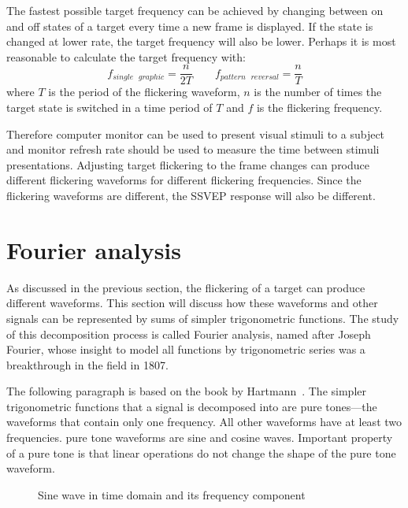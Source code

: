 The fastest possible target frequency can be achieved by changing between on and off \glspl{state} of a target every time a new \gls{frame} is displayed. If the \gls{state} is changed at lower rate, the \gls{target} frequency will also be lower. Perhaps it is most reasonable to calculate the \gls{target} frequency with:
\begin{equation}
	f_{single\mbox{ }graphic} = \frac{n}{2T} \qquad f_{pattern\mbox{ }reversal} = \frac{n}{T}
\end{equation}
where $T$ is the period of the \gls{flickering waveform}, $n$ is the number of times the \gls{target} \gls{state} is switched in a time period of $T$ and $f$ is the \gls{flickering} frequency.

Therefore computer monitor can be used to present visual stimuli to a subject and monitor \gls{refresh rate} should be used to measure the time between stimuli presentations. Adjusting \gls{target} \gls{flickering} to the \gls{frame} changes can produce different \glspl{flickering waveform} for different \gls{flickering} frequencies. Since the \glspl{flickering waveform} are different, the \gls{SSVEP} response will also be different.

\section{Fourier analysis}
\label{sec:fourier}

As discussed in the previous section, the \gls{flickering} of a \gls{target} can produce different waveforms. This section will discuss how these waveforms and other signals can be represented by sums of simpler trigonometric functions. The study of this decomposition process is called Fourier analysis, named after Joseph Fourier, whose insight to model all functions by trigonometric series was a breakthrough in the field in 1807.

The following paragraph is based on the book by Hartmann~\cite{pure_tone}. The simpler trigonometric functions that a signal is decomposed into are \glspl{pure tone}---the waveforms that contain only one frequency. All other waveforms have at least two frequencies. \Gls{pure tone} waveforms are sine and cosine waves. Important property of a \gls{pure tone} is that linear operations do not change the shape of the \gls{pure tone} waveform.

\begin{figure}[h]
	
	\caption{Sine wave in time domain and its frequency component}
\end{figure}

